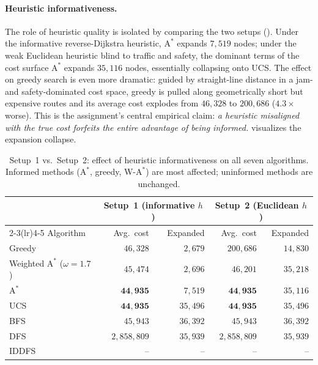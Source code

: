 \documentclass{ai-lab-report}
\begin{document}
\paragraph{Heuristic informativeness.}
The role of heuristic quality is isolated by comparing the two setups (). 
Under the informative reverse-Dijkstra heuristic, $\text{A}^\ast$ expands $7{,}519$ nodes; under 
the weak Euclidean heuristic blind to traffic and safety, the dominant terms of the cost surface $\text{A}^\ast$ expands $35{,}116$ nodes, essentially collapsing onto UCS. The effect on greedy search is even more dramatic: guided by straight-line distance in a jam- and safety-dominated cost space, greedy is pulled along geometrically short but expensive routes and its average cost explodes from $46{,}328$ to $200{,}686$ ($4.3\times$ worse). This is the assignment's central empirical claim: \emph{a heuristic misaligned with the true cost forfeits the entire advantage of being informed.}   visualizes the expansion collapse.

\begin{table}[H]
\centering
\small
\begin{tabularx}{\linewidth}{@{}Xrrrr@{}}
\toprule
& \multicolumn{2}{c}{\textbf{Setup~1} (informative $h$)} & \multicolumn{2}{c}{\textbf{Setup~2} (Euclidean $h$)} \\
\cmidrule(lr){2-3}\cmidrule(lr){4-5}
Algorithm & Avg.\ cost & Expanded & Avg.\ cost & Expanded \\
\midrule
Greedy                            & $46{,}328$          & $2{,}679$  & $200{,}686$         & $14{,}830$ \\
Weighted $\text{A}^\ast$ ($\omega{=}1.7$) & $45{,}474$          & $2{,}696$  & $46{,}201$          & $35{,}218$ \\
$\text{A}^\ast$                   & $\mathbf{44{,}935}$ & $7{,}519$  & $\mathbf{44{,}935}$ & $35{,}116$ \\
UCS                               & $\mathbf{44{,}935}$ & $35{,}496$ & $\mathbf{44{,}935}$ & $35{,}496$ \\
BFS                               & $45{,}943$          & $36{,}392$ & $45{,}943$          & $36{,}392$ \\
DFS                               & $2{,}858{,}809$     & $35{,}939$ & $2{,}858{,}809$     & $35{,}939$ \\
IDDFS                             & --                  & --         & --                  & -- \\
\bottomrule
\end{tabularx}
\caption{Setup~1 vs.\ Setup~2: effect of heuristic informativeness on all seven algorithms. 
Informed methods ($\text{A}^\ast$, greedy, W-$\text{A}^\ast$) are most affected; uninformed methods are unchanged.}
\label{tab:a1setup2}
\end{table}
\end{document}

